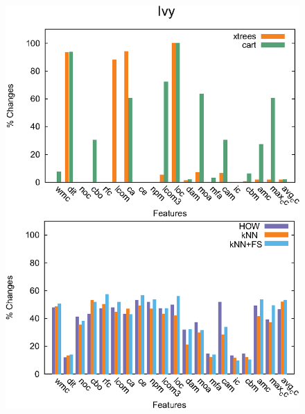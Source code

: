 \documentclass{sig-alternate}
\begin{document}




\begin{figure}[t]
\begin{minipage}{0.5\textwidth}
\includegraphics[width=0.9\linewidth]{Deltas-Ivy.eps}
\label{fig:delta_ivy}


\end{minipage}
\end{figure}
\end{document}
